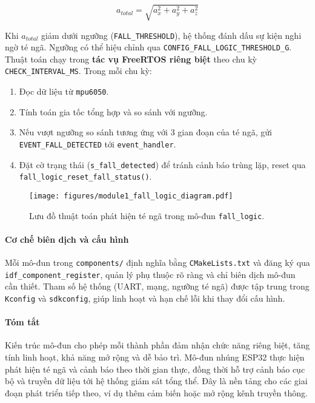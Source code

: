 \[
a_{total} = \sqrt{a_x^2 + a_y^2 + a_z^2}
\]

Khi $a_{total}$ giảm dưới ngưỡng (\texttt{FALL\_THRESHOLD}), hệ thống đánh dấu sự kiện nghi ngờ té ngã. Ngưỡng có thể hiệu chỉnh qua \texttt{CONFIG\_FALL\_LOGIC\_THRESHOLD\_G}. Thuật toán chạy trong \textbf{tác vụ FreeRTOS riêng biệt} theo chu kỳ \texttt{CHECK\_INTERVAL\_MS}. Trong mỗi chu kỳ:

\begin{enumerate}
    \item Đọc dữ liệu từ \texttt{mpu6050}.  
    \item Tính toán gia tốc tổng hợp và so sánh với ngưỡng.  
    \item Nếu vượt ngưỡng so sánh tương ứng với 3 gian đoạn của té ngã, gửi \texttt{EVENT\_FALL\_DETECTED} tới \texttt{event\_handler}.  
    \item Đặt cờ trạng thái (\texttt{s\_fall\_detected}) để tránh cảnh báo trùng lặp, reset qua \texttt{fall\_logic\_reset\_fall\_status()}.
\end{enumerate}

\begin{figure}[h!]
    \centering
    \texttt{[image: figures/module1\_fall\_logic\_diagram.pdf]}
    \caption{Lưu đồ thuật toán phát hiện té ngã trong mô-đun \texttt{fall\_logic}.}
    \label{fig:fall_logic_flow}
\end{figure}

\paragraph{Cơ chế biên dịch và cấu hình}  
Mỗi mô-đun trong \texttt{components/} định nghĩa bằng \texttt{CMakeLists.txt} và đăng ký qua \texttt{idf\_component\_register}, quản lý phụ thuộc rõ ràng và chỉ biên dịch mô-đun cần thiết. Tham số hệ thống (UART, mạng, ngưỡng té ngã) được tập trung trong \texttt{Kconfig} và \texttt{sdkconfig}, giúp linh hoạt và hạn chế lỗi khi thay đổi cấu hình.

\paragraph{Tóm tắt}  
Kiến trúc mô-đun cho phép mỗi thành phần đảm nhận chức năng riêng biệt, tăng tính linh hoạt, khả năng mở rộng và dễ bảo trì. Mô-đun nhúng ESP32 thực hiện phát hiện té ngã và cảnh báo theo thời gian thực, đồng thời hỗ trợ cảnh báo cục bộ và truyền dữ liệu tới hệ thống giám sát tổng thể. Đây là nền tảng cho các giai đoạn phát triển tiếp theo, ví dụ thêm cảm biến hoặc mở rộng kênh truyền thông.
